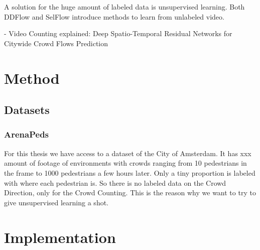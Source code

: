 \documentclass{article}
\begin{document}
A solution for the huge amount of labeled data is unsupervised learning. Both DDFlow \cite{liu_ddflow_2019} and SelFlow \cite{liu_selflow_2019} introduce methods to learn from unlabeled video.

- Video Counting explained: Deep Spatio-Temporal Residual Networks for Citywide Crowd Flows Prediction

\section{Method}

\subsection{Datasets}

\subsubsection{ArenaPeds}
For this thesis we have access to a dataset of the City of Amsterdam. It has xxx amount of footage of environments with crowds ranging from 10 pedestrians in the frame to 1000 pedestrians a few hours later. Only a tiny proportion is labeled with where each pedestrian is. So there is no labeled data on the Crowd Direction, only for the Crowd Counting. This is the reason why we want to try to give unsupervised learning a shot.


\section{Implementation}



\end{document}
